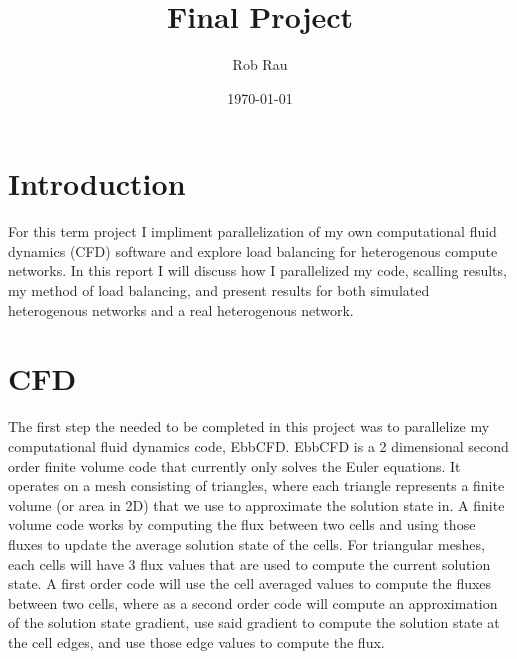 \documentclass[12pt,parskip=full]{article}
\numberwithin{subsection}{section}
\begin{document}
	\vspace{-4ex}
	\title{Final Project\vspace{-3.5ex}}
	\author{Rob Rau\vspace{-4ex}}
	\date{\today\vspace{-4ex}}
	\maketitle

	\section{Introduction}
		For this term project I impliment parallelization of my own computational fluid dynamics (CFD) software and explore load balancing
		for heterogenous compute networks. In this report I will discuss how I parallelized my code, scalling results, my method of
		load balancing, and present results for both simulated heterogenous networks and a real heterogenous network. 

	\section{CFD}
		The first step the needed to be completed in this project was to parallelize my computational fluid dynamics code, EbbCFD.
		EbbCFD is a 2 dimensional second order finite volume code that currently only solves the Euler equations. It operates on a
		mesh consisting of triangles, where each triangle represents a finite volume (or area in 2D) that we use to approximate the
		solution state in. A finite volume code works by computing the flux between two cells and using those fluxes to update the
		average solution state of the cells. For triangular meshes, each cells will have 3 flux values that are used to compute the
		current solution state. A first order code will use the cell averaged values to compute the fluxes between two cells, where
		as a second order code will compute an approximation of the solution state gradient, use said gradient to compute the solution
		state at the cell edges, and use those edge values to compute the flux.
		
\end{document}
